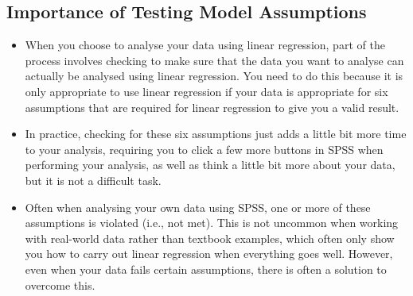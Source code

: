 \documentclass[a4paper,12pt]{article}
\begin{document}
\subsection{Importance of Testing Model Assumptions}
\begin{itemize}
\item When you choose to analyse your data using linear regression, part of the process involves checking to make sure that the data you want to analyse can actually be analysed using linear regression. You need to do this because it is only appropriate to use linear regression if your data is appropriate for six assumptions that are required for linear regression to give you a valid result.

\item In practice, checking for these six assumptions just adds a little bit more time to your analysis, requiring you to click a few more buttons in SPSS when performing your analysis, as well as think a little bit more about your data, but it is not a difficult task.

\item Often when analysing your own data using SPSS, one or more of these assumptions is violated (i.e., not met). This is not uncommon when working with real-world data rather than textbook examples, which often only show you how to carry out linear regression when everything goes well. However, even when your data fails certain assumptions, there is often a solution to overcome this. 
\end{itemize}
\end{document}
